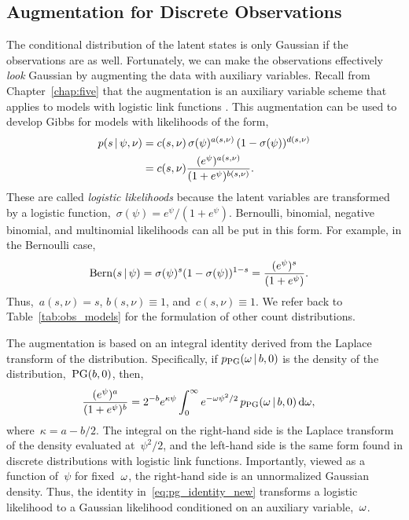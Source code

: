 \subsection{\polyagamma Augmentation for Discrete Observations}
The conditional distribution of the latent states is only Gaussian
if the observations are as well. Fortunately, we can make the
observations effectively \emph{look} Gaussian by augmenting the
data with \polyagamma auxiliary variables. 
Recall from Chapter~\ref{chap:five} that the \polyagamma augmentation
is an auxiliary variable scheme that applies to models with logistic
link functions \citep{polson2013bayesian}.  This augmentation can be
used to develop Gibbs for models with likelihoods of the form,
\begin{align*}
  \nonumber  p(s \,|\, \psi, \nu)
  &= c(s, \nu) \, \sigma(\psi)^{a(s, \nu)} \,
  (1-\sigma(\psi))^{d(s, \nu)} \\
  &= c(s, \nu)
  \frac{(e^{\psi})^{a(s, \nu)}}
       {(1+e^{\psi})^{b(s, \nu)}}.
\end{align*}
These are called \emph{logistic likelihoods} because the latent
variables are transformed by a logistic
function,~${\sigma(\psi)=e^\psi /(1+e^\psi)}$.  Bernoulli, binomial,
negative binomial, and multinomial likelihoods can all be put in this
form.  For example, in the Bernoulli
case,
\begin{align*}
  \mathrm{Bern}(s \,|\, \psi) 
  &= \sigma(\psi)^{s}
    (1-\sigma(\psi))^{1-s}
  = \frac{(e^{\psi})^{s}}
       {(1+e^{\psi})}.
\end{align*}
Thus,~${a(s, \nu) = s}$,
${b(s,\nu) \equiv 1}$, and~${c(s, \nu) \equiv 1}$.
We refer back to Table~\ref{tab:obs_models} for the formulation of
other count distributions.

The augmentation is based on an integral identity
derived from the Laplace transform of the \polyagamma distribution.
Specifically, if $p_{\mathrm{PG}}({\omega}\,|\, b, 0)$ is the
density of the \polyagamma distribution,~${\mathrm{PG}(b, 0)}$,
then,
\begin{align}
  \frac{(e^{\psi})^a}{(1+e^{\psi})^b}
  &= 2^{-b} e^{\kappa \psi}
  \int_{0}^{\infty} e^{-{\omega} \psi^2 /2} \,
  p_{\mathrm{PG}}({\omega} \,|\, b, 0) \, \mathrm{d}{\omega},
\label{eq:pg_identity_new}
\end{align}
where~${\kappa=a-b/2}$. The integral on the right-hand side is the
Laplace transform of the \polyagamma density evaluated at~$\psi^2/2$,
and the left-hand side is the same form found in discrete
distributions with logistic link functions.  Importantly, viewed as a
function of~$\psi$ for fixed~${\omega}$, the right-hand side is an
unnormalized Gaussian density.  Thus, the identity
in~\eqref{eq:pg_identity_new} transforms a logistic likelihood to a
Gaussian likelihood conditioned on an auxiliary variable,~${\omega}$.

